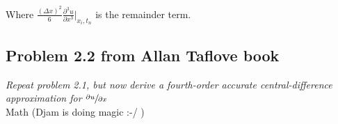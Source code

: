 Where $\frac{(\Delta x)^{2}}{6} \frac{\partial^{3} u}{\partial x^{3}}\vert _{x_{i},t_{n}}$ is the remainder term.

\subsection{Problem 2.2 from Allan Taflove book}
\textit{Repeat problem 2.1, but now derive a fourth-order accurate central-difference approximation for $\sfrac{\partial u}{\partial x}$}\\


Math (Djam is doing magic :-/ )